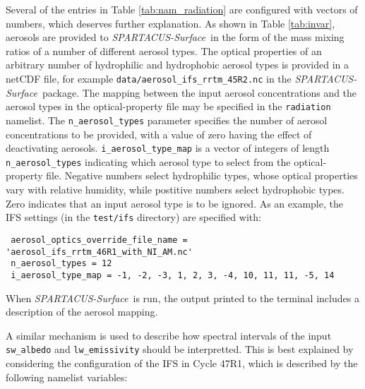 \documentclass[a4,oneside]{article}
\def\codesize{\small}
\def\spsurf{\emph{SPARTACUS-Surface}}
\def\code#1{{\codesize\texttt{#1}}}
\begin{document}
Several of the entries in Table \ref{tab:nam_radiation} are configured
with vectors of numbers, which deserves further explanation. As shown
in Table \ref{tab:invar}, aerosols are provided to \spsurf\ in the form
of the mass mixing ratios of a number of different aerosol types. The
optical properties of an arbitrary number of hydrophilic and
hydrophobic aerosol types is provided in a netCDF file, for example
\code{data/aerosol\_ifs\_rrtm\_45R2.nc} in the \spsurf\ package. The
mapping between the input aerosol concentrations and the aerosol types
in the optical-property file may be specified in the \code{radiation}
namelist. The \code{n\_aerosol\_types} parameter specifies the number
of aerosol concentrations to be provided, with a value of zero having
the effect of deactivating aerosols. \code{i\_aerosol\_type\_map} is a
vector of integers of length \code{n\_aerosol\_types} indicating which
aerosol type to select from the optical-property file. Negative
numbers select hydrophilic types, whose optical properties vary with
relative humidity, while postitive numbers select hydrophobic
types. Zero indicates that an input aerosol type is to be ignored. As
an example, the IFS settings (in the \code{test/ifs} directory) are
specified with:
%

\begin{lstlisting}
 aerosol_optics_override_file_name = 'aerosol_ifs_rrtm_46R1_with_NI_AM.nc'
 n_aerosol_types = 12
 i_aerosol_type_map = -1, -2, -3, 1, 2, 3, -4, 10, 11, 11, -5, 14
\end{lstlisting}
%
When \spsurf\ is run, the output printed to the terminal includes a
description of the aerosol mapping.

A similar mechanism is used to describe how spectral intervals of the
input \code{sw\_albedo} and \code{lw\_emissivity} should be
interpretted.  This is best explained by considering the configuration
of the IFS in Cycle 47R1, which is described by the following namelist
variables:
%
\end{document}
